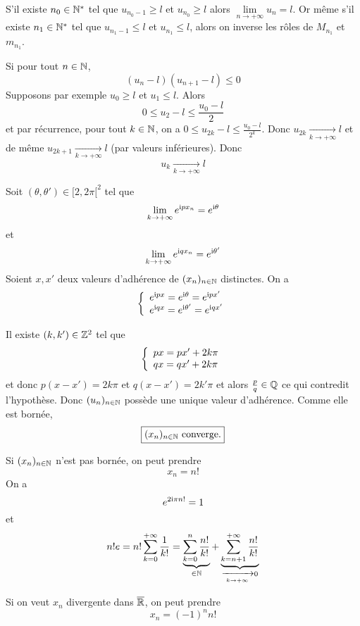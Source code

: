 \begin{solution}
	S'il existe $n_{0}\in\mathbb{N}^{*}$ tel que $u_{n_{0}-1}\geqslant l$ et $u_{n_{0}}\geqslant l$ alors $\lim\limits_{n\to+\infty}u_{n}=l$. Or même s'il existe $n_{1}\in\mathbb{N}^{*}$ tel que $u_{n_{1}-1}\leqslant l$ et $u_{n_{1}}\leqslant l$, alors on inverse les rôles de $M_{n_{1}}$ et $m_{n_{1}}$.

	Si pour tout $n\in\mathbb{N}$,
	$$(u_{n}-l)(u_{n+1}-l)\leqslant 0$$
	Supposons par exemple $u_{0}\geqslant l$ et $u_{1}\leqslant l$. Alors 
	$$0\leqslant u_{2}-l\leqslant\frac{u_{0}-l}{2}$$
	et par récurrence, pour tout $k\in\mathbb{N}$, on a $0\leqslant u_{2k}-l\leqslant\frac{u_{0}-l}{2^{k}}$.
	Donc $u_{2k}\xrightarrow[k\to+\infty]{}l$ et de même $u_{2k+1}\xrightarrow[k\to+\infty]{}l$ (par valeurs inférieures). Donc 
	$$\boxed{u_{k}\xrightarrow[k\to+\infty]{}l}$$
\end{solution}

\begin{solution}
	Soit $(\theta,\theta')\in[2,2\pi[^{2}$ tel que 
	$$\lim\limits_{k\to+\infty}e^{\mathrm{i} px_{n}}=e^{\mathrm{i} \theta}$$ et 
	$$\lim\limits_{k\to+\infty}e^{\mathrm{i} qx_{n}}=e^{\mathrm{i} \theta'}$$
	Soient $x,x'$ deux valeurs d'adhérence de $(x_{n})_{n\in\mathbb{N}}$ distinctes. On a 
	$$
	\left\{
		\begin{array}[]{l}
			e^{\i px}=e^{\i \theta}=e^{\i px'}\\
			e^{\i qx}=e^{\i \theta'}=e^{\i qx'}
		\end{array}
	\right.
	$$

	Il existe $(k,k')\in\mathbb{Z}^{2}$ tel que 
	$$
	\left\{
		\begin{array}[]{l}
			px=px'+2k\pi\\
			qx=qx'+2k\pi
		\end{array}
	\right.
	$$
	et donc $p(x-x')=2k\pi$ et $q(x-x')=2k'\pi$ et alors $\frac{p}{q}\in\mathbb{Q}$ ce qui contredit l'hypothèse. Donc $(u_{n})_{n\in\mathbb{N}}$ possède une unique valeur d'adhérence. Comme elle est bornée,
	$$\boxed{(x_{n})_{n\in\mathbb{N}}\text{ converge.}}$$

	Si $(x_{n})_{n\in\mathbb{N}}$ n'est pas bornée, on peut prendre 
	$$\boxed{x_{n}=n!}$$
	On a 
	$$e^{2\mathrm{i} \pi n!}=1$$
	et 
	$$n!e=n!\sum_{k=0}^{+\infty}\frac{1}{k!}=\underbrace{\sum_{k=0}^{n}\frac{n!}{k!}}_{\in\mathbb{N}}+\underbrace{\sum_{k=n+1}^{+\infty}\frac{n!}{k!}}_{\xrightarrow[k\to+\infty]{}0}$$
	
	Si on veut $x_{n}$ divergente dans $\overline{\mathbb{R}}$, on peut prendre 
	$$\boxed{x_{n}=(-1)^{n}n!}$$
\end{solution}